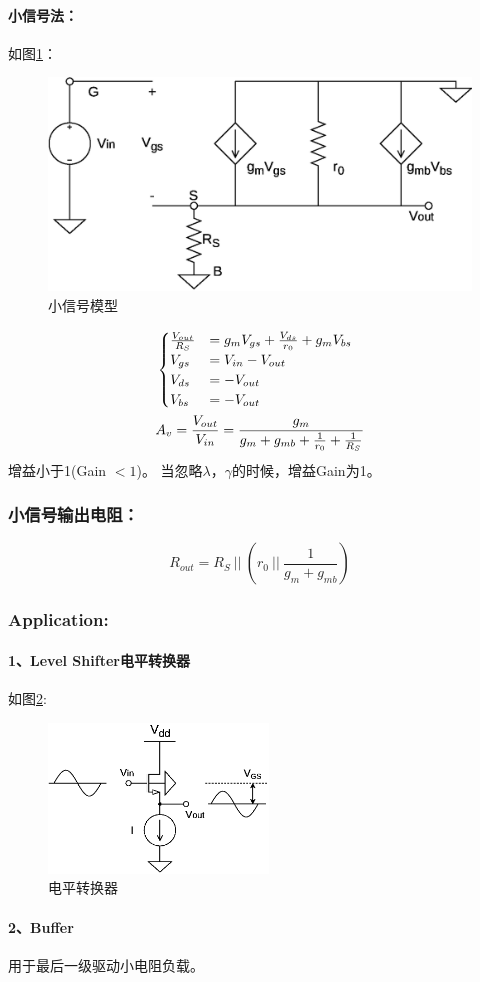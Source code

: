 \documentclass[twoside,a4paper,openright,titlepage,draft]{ctexrep}
\begin{document}
\paragraph{小信号法：}
如图\ref{fig:小信号模型}：
\begin{figure}[H]
    \centering
    \includegraphics[width=0.8\columnwidth]{smallsignal.eps}
    \caption{小信号模型}
    \label{fig:小信号模型}
\end{figure}
\begin{align}
    &\begin{cases}
        \frac{V_{out}}{R_S} &= g_mV_{gs} + \frac{V_{ds}}{r_0} + g_mV_{bs} \\
        V_{gs} &= V_{in} - V_{out} \\
        V_{ds} &= - V_{out} \\
        V_{bs} &= -V_{out} \\
    \end{cases} \\
    \vspace{2mm}
    &A_v = \frac{V_{out}}{V_{in}} = \frac{g_m}{g_m + g_{mb} + \frac{1}{r_0} + \frac{1}{R_S}}
\end{align}
增益小于1(Gain $<1$)。
当忽略$\lambda$，$\gamma$的时候，增益Gain为1。
\subsubsection{小信号输出电阻：}
\begin{equation}
    R_{out} = R_S\ ||\ (r_0\ ||\ \frac{1}{g_m + g_{mb}})
\end{equation}
\subsubsection{Application:}
\paragraph{1、Level Shifter电平转换器}
如图\ref{fig:电平转换器}:
\begin{figure}[H]
    \centering
    \includegraphics[height=40mm]{levelshifter.eps}
    \caption{电平转换器}
    \label{fig:电平转换器}
\end{figure}
\paragraph{2、Buffer}
用于最后一级驱动小电阻负载。
\end{document}
